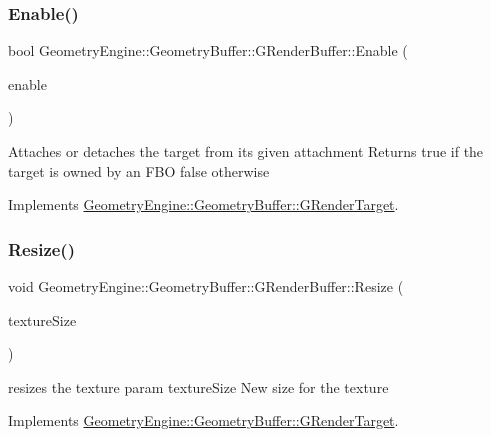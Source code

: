 \subsubsection{\texorpdfstring{Enable()}{Enable()}}
{\footnotesize\ttfamily bool Geometry\+Engine\+::\+Geometry\+Buffer\+::\+G\+Render\+Buffer\+::\+Enable (\begin{DoxyParamCaption}\item[{bool}]{enable }\end{DoxyParamCaption})\hspace{0.3cm}{\ttfamily [virtual]}}

Attaches or detaches the target from its given attachment Returns true if the target is owned by an F\+BO false otherwise 

Implements \mbox{\hyperlink{class_geometry_engine_1_1_geometry_buffer_1_1_g_render_target_a1b8be750dfd13582d0730bf9e4c4e1d2}{Geometry\+Engine\+::\+Geometry\+Buffer\+::\+G\+Render\+Target}}.

\mbox{\label{class_geometry_engine_1_1_geometry_buffer_1_1_g_render_buffer_a3a3e0b2e031cce1c0bea9c2a4bc5465a}} 
\subsubsection{\texorpdfstring{Resize()}{Resize()}}
{\footnotesize\ttfamily void Geometry\+Engine\+::\+Geometry\+Buffer\+::\+G\+Render\+Buffer\+::\+Resize (\begin{DoxyParamCaption}\item[{const Q\+Vector2D \&}]{texture\+Size }\end{DoxyParamCaption})\hspace{0.3cm}{\ttfamily [virtual]}}

resizes the texture param texture\+Size New size for the texture 

Implements \mbox{\hyperlink{class_geometry_engine_1_1_geometry_buffer_1_1_g_render_target_ac1e54f456408b53de44fe10116d649dd}{Geometry\+Engine\+::\+Geometry\+Buffer\+::\+G\+Render\+Target}}.

\mbox{\label{class_geometry_engine_1_1_geometry_buffer_1_1_g_render_buffer_adb0c62f7d9fb1d61b3ea84bc026fa539}} 
